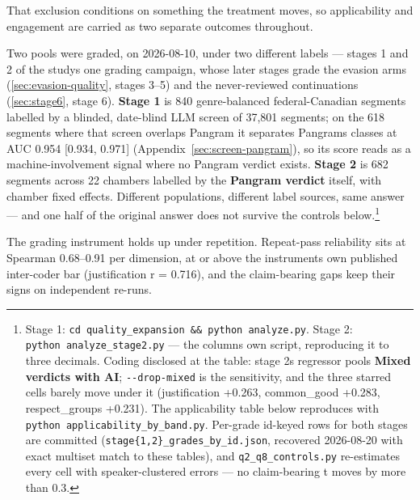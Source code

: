 That exclusion conditions on something the treatment moves, so applicability
and engagement are carried as two separate outcomes throughout.

Two pools were graded, on 2026-08-10, under two different labels --- stages 1 and
2 of the study\textquotesingle s one grading campaign, whose later stages grade the evasion arms
(\cref{sec:evasion-quality}, stages 3--5) and the never-reviewed continuations (\cref{sec:stage6}, stage 6).
\textbf{Stage 1} is 840 genre-balanced federal-Canadian segments labelled by a
blinded, date-blind LLM screen of 37,801 segments; on the 618 segments where
that screen overlaps Pangram it separates Pangram\textquotesingle s classes at AUC 0.954 {[}0.934,
0.971{]} (Appendix~\ref{sec:screen-pangram}), so its score reads as a machine-involvement signal where
no Pangram verdict exists. \textbf{Stage 2} is 682 segments across 22 chambers
labelled by the \textbf{Pangram verdict} itself, with chamber fixed effects.
Different populations, different label sources, same answer --- and one half of
the original answer does not survive the controls below.\footnote{Stage 1: \texttt{cd\ quality\_\allowbreak{}expansion\ \&\&\ python\ analyze.\allowbreak{}py}. Stage 2:
  \texttt{python\ analyze\_\allowbreak{}stage2.\allowbreak{}py} --- the column\textquotesingle s own script,
  reproducing it to three decimals. Coding disclosed at the table: stage
  2\textquotesingle s regressor pools \textbf{Mixed verdicts with AI};
  \texttt{-\/-drop-mixed} is the sensitivity, and the three starred cells barely
  move under it (justification +0.263, common\_good +0.283, respect\_groups
  +0.231). The applicability table below reproduces with
  \texttt{python\ applicability\_\allowbreak{}by\_\allowbreak{}band.\allowbreak{}py}. Per-grade id-keyed rows for both
  stages are committed (\texttt{stage\{1,2\}\_grades\_by\_id.json}, recovered
  2026-08-20 with exact multiset match to these tables), and
  \texttt{q2\_q8\_controls.py} re-estimates every cell with speaker-clustered
  errors --- no claim-bearing t moves by more than 0.3.}

The grading instrument holds up under repetition. Repeat-pass
reliability sits at Spearman 0.68--0.91 per dimension, at or above the
instrument\textquotesingle s own published inter-coder bar (justification r = 0.716), and the
claim-bearing gaps keep their signs on independent re-runs.

